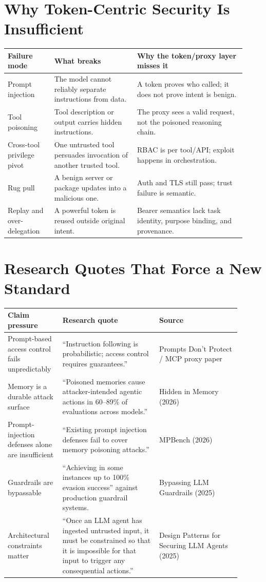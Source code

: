 \documentclass[10pt]{article}
\begin{document}
\section{Why Token-Centric Security Is Insufficient}
\begin{longtable}{@{}p{0.18\linewidth}p{0.32\linewidth}p{0.42\linewidth}@{}}
\toprule
\textbf{Failure mode} & \textbf{What breaks} & \textbf{Why the token/proxy layer misses it} \\
\midrule
\endhead
Prompt injection & The model cannot reliably separate instructions from data. & A token proves who called; it does not prove intent is benign. \\
Tool poisoning & Tool description or output carries hidden instructions. & The proxy sees a valid request, not the poisoned reasoning chain. \\
Cross-tool privilege pivot & One untrusted tool persuades invocation of another trusted tool. & RBAC is per tool/API; exploit happens in orchestration. \\
Rug pull & A benign server or package updates into a malicious one. & Auth and TLS still pass; trust failure is semantic. \\
Replay and over-delegation & A powerful token is reused outside original intent. & Bearer semantics lack task identity, purpose binding, and provenance. \\
\bottomrule
\end{longtable}

\section{Research Quotes That Force a New Standard}
\begin{longtable}{@{}p{0.20\linewidth}p{0.38\linewidth}p{0.32\linewidth}@{}}
\toprule
\textbf{Claim pressure} & \textbf{Research quote} & \textbf{Source} \\
\midrule
\endhead
Prompt-based access control fails unpredictably & ``Instruction following is probabilistic; access control requires guarantees.'' & Prompts Don't Protect / MCP proxy paper \\
Memory is a durable attack surface & ``Poisoned memories cause attacker-intended agentic actions in 60--89\% of evaluations across models.'' & Hidden in Memory (2026) \\
Prompt-injection defenses alone are insufficient & ``Existing prompt injection defenses fail to cover memory poisoning attacks.'' & MPBench (2026) \\
Guardrails are bypassable & ``Achieving in some instances up to 100\% evasion success'' against production guardrail systems. & Bypassing LLM Guardrails (2025) \\
Architectural constraints matter & ``Once an LLM agent has ingested untrusted input, it must be constrained so that it is impossible for that input to trigger any consequential actions.'' & Design Patterns for Securing LLM Agents (2025) \\
\bottomrule
\end{longtable}
\end{document}
